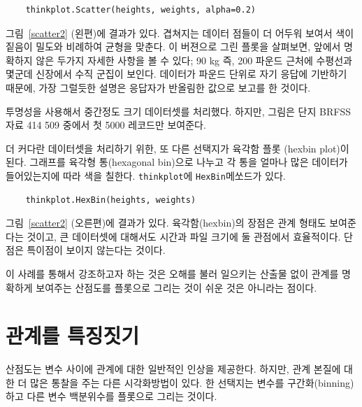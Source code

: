 %
\begin{verbatim}
    thinkplot.Scatter(heights, weights, alpha=0.2)
\end{verbatim}
%

그림~\ref{scatter2} (왼편)에 결과가 있다.
겹쳐지는 데이터 점들이 더 어두워 보여서 색이 짙음이 밀도와 비례하여 균형을 맞춘다. 이 버젼으로 그린 플롯을 살펴보면, 앞에서 명확하지 않은 두가지 자세한 사항을 볼 수 있다; 90 kg 즉, 200 파운드 근처에 수평선과 몇군데 신장에서 수직 군집이 보인다. 데이터가 파운드 단위로 자기 응답에 기반하기 때문에, 가장 그럴듯한 설명은 응답자가 반올림한 값으로 보고를 한 것이다.


투명성을 사용해서 중간정도 크기 데이터셋를 처리했다.
하지만, 그림은 단지 BRFSS 자료 414 509 중에서 첫 5000 레코드만 보여준다.


더 커다란 데이터셋을 처리하기 위한,
또 다른 선택지가 육각함 플롯 (hexbin plot)이 된다.
그래프를 육각형 통(hexagonal bin)으로 나누고 각 통을 얼마나 많은 데이터가 들어있는지에 따라 색을 칠한다. {\tt thinkplot}에 {\tt HexBin}메쏘드가 있다.
%
\begin{verbatim}
    thinkplot.HexBin(heights, weights)
\end{verbatim}
%

그림~\ref{scatter2} (오른편)에 결과가 있다.
육각함(hexbin)의 장점은 관계 형태도 보여준다는 것이고,
큰 데이터셋에 대해서도 시간과 파일 크기에 둘 관점에서 효율적이다.
단점은 특이점이 보이지 않는다는 것이다.
 

이 사례를 통해서 강조하고자 하는 것은 오해를 불러 일으키는 산출물 없이 관계를 명확하게 보여주는 산점도를 플롯으로 그리는 것이 쉬운 것은 아니라는 점이다.



\section{관계를 특징짓기}
\label{characterizing}

산점도는 변수 사이에 관계에 대한 일반적인 인상을 제공한다. 하지만, 관계 본질에 대한 더 많은 통찰을 주는 
다른 시각화방법이 있다. 한 선택지는 변수를 구간화(binning)하고 다른 변수 백분위수를 플롯으로 그리는 것이다.


